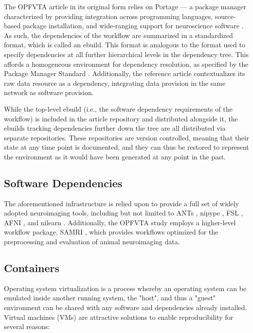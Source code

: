 The OPFVTA article in its original form relies on Portage \cite{portage} — a package manager characterized by providing integration across programming languages, source-based package installation, and wide-ranging support for neuroscience software \cite{ng}.
As such, the dependencies of the workflow are summarized in a standardized format, which is called an ebuild.
This format is analogous to the format used to specify dependencies at all further hierarchical levels in the dependency tree.
This affords a homogeneous environment for dependency resolution, as specified by the Package Manager Standard \cite{pms}.
Additionally, the reference article contextualizes its raw data resource as a dependency, integrating data provision in the same network as software provision.

While the top-level ebuild (i.e., the software dependency requirements of the workflow) is included in the article repository and distributed alongside it, the ebuilds tracking dependencies further down the tree are all distributed via separate repositories.
These repositories are version controlled, meaning that their state at any time point is documented, and they can thus be restored to represent the environment as it would have been generated at any point in the past.


\subsection{Software Dependencies}

The aforementioned infrastructure is relied upon to provide a full set of widely adopted neuroimaging tools, including but not limited to ANTs \cite{ants}, nipype \cite{nipype}, FSL \cite{fsl}, AFNI \cite{afni}, and nilearn \cite{nilearn}.
Additionally, the OPFVTA study employs a higher-level workflow package, SAMRI \cite{samri,irsabi}, which provides workflows optimized for the preprocessing and evaluation of animal neuroimaging data.


\subsection{Containers}

Operating system virtualization is a process whereby an operating system can be emulated inside another running system, the "host", and thus a "guest" environment can be shared with any software and dependencies already installed.
Virtual machines (VMs) are attractive solutions to enable reproducibility for several reasons:

